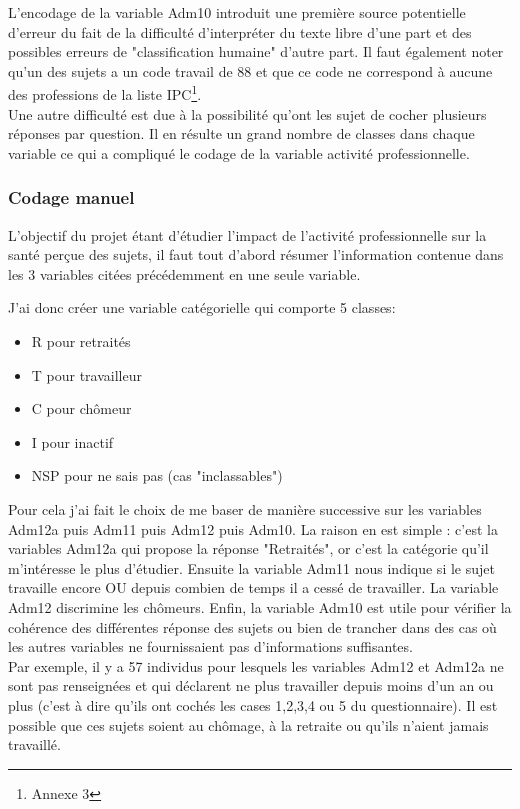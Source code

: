 \documentclass{book}
\begin{document}
\noindent
L'encodage de la variable Adm10 introduit une première source potentielle d'erreur du fait de la difficulté d'interpréter du texte libre d'une part et des possibles erreurs de "classification humaine" d'autre part. Il faut également noter qu'un des sujets a un code travail de 88 et que ce code ne correspond à aucune des professions de la liste IPC\footnote{Annexe 3}.\\

\noindent
Une autre difficulté est due à la possibilité qu'ont les sujet de cocher plusieurs réponses par question. Il en résulte un grand nombre de classes dans chaque variable ce qui a compliqué le codage de la variable activité professionnelle.

\subsubsection{Codage manuel}
\noindent
L'objectif du projet étant d'étudier l'impact de l'activité professionnelle sur la santé perçue des sujets, il faut tout d'abord résumer l'information contenue dans les 3 variables citées précédemment en une seule variable.

\noindent
J'ai donc créer une variable catégorielle qui comporte 5 classes:
\begin{itemize}[label=\textbullet, font=\small \color{black} ]
\item R pour retraités
\item T pour travailleur
\item C pour chômeur
\item I pour inactif
\item NSP pour ne sais pas (cas "inclassables")
\end{itemize}

\noindent
Pour cela j'ai fait le choix de me baser de manière successive sur les variables Adm12a puis Adm11 puis Adm12 puis Adm10. La raison en est simple : c'est la variables Adm12a qui propose la réponse "Retraités", or c'est la catégorie qu'il m'intéresse le plus d'étudier. Ensuite la variable Adm11 nous indique si le sujet travaille encore OU depuis combien de temps il a cessé de travailler. La variable Adm12 discrimine les chômeurs. Enfin, la variable Adm10 est utile pour vérifier la cohérence des différentes réponse des sujets ou bien de trancher dans des cas où les autres variables ne fournissaient pas d'informations suffisantes.\\

\noindent
Par exemple, il y a 57 individus pour lesquels les variables Adm12 et Adm12a ne sont pas renseignées et qui déclarent ne plus travailler depuis moins d'un an ou plus (c'est à dire qu'ils ont cochés les cases 1,2,3,4 ou 5 du questionnaire). Il est possible que ces sujets soient au chômage, à la retraite ou qu'ils n'aient jamais travaillé.\\
\end{document}
